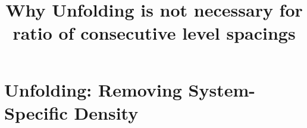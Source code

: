 \documentclass[10pt]{article}
\title{Why Unfolding is not necessary for ratio of consecutive level spacings}
\author{}
\date{}
\begin{document}
\maketitle

%
%
%
\section{Unfolding: Removing System-Specific Density}
\end{document}
